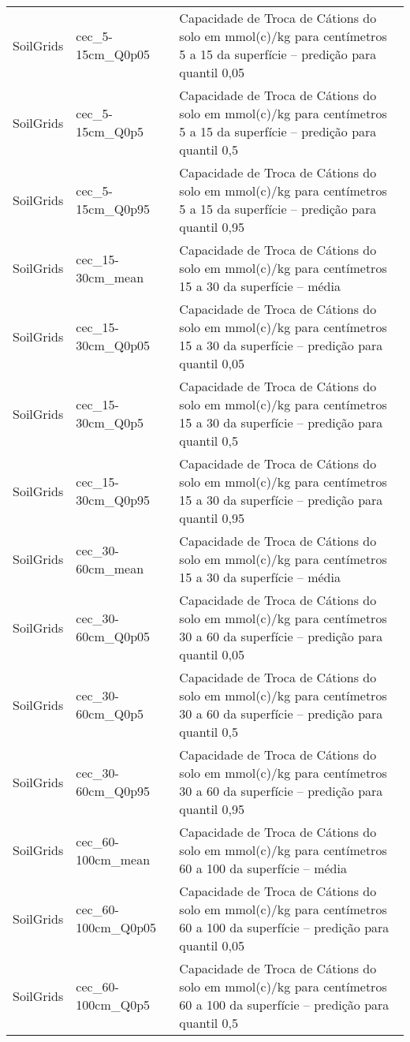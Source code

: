 \begin{longtable}{@{} p{4cm} p{4cm} p{8cm} @{}}
	SoilGrids &
	cec\_5-15cm\_Q0p05 &
	Capacidade de Troca de Cátions do solo em mmol(c)/kg para centímetros 5 a 15 da superfície – predição para quantil 0,05 \\
	SoilGrids &
	cec\_5-15cm\_Q0p5 &
	Capacidade de Troca de Cátions do solo em mmol(c)/kg para centímetros 5 a 15 da superfície – predição para quantil 0,5 \\
	SoilGrids &
	cec\_5-15cm\_Q0p95 &
	Capacidade de Troca de Cátions do solo em mmol(c)/kg para centímetros 5 a 15 da superfície – predição para quantil 0,95 \\
	SoilGrids &
	cec\_15-30cm\_mean &
	Capacidade de Troca de Cátions do solo em mmol(c)/kg para centímetros 15 a 30 da superfície – média \\
	SoilGrids &
	cec\_15-30cm\_Q0p05 &
	Capacidade de Troca de Cátions do solo em mmol(c)/kg para centímetros 15 a 30 da superfície – predição para quantil 0,05 \\
	SoilGrids &
	cec\_15-30cm\_Q0p5 &
	Capacidade de Troca de Cátions do solo em mmol(c)/kg para centímetros 15 a 30 da superfície – predição para quantil 0,5 \\
	SoilGrids &
	cec\_15-30cm\_Q0p95 &
	Capacidade de Troca de Cátions do solo em mmol(c)/kg para centímetros 15 a 30 da superfície – predição para quantil 0,95 \\
	SoilGrids &
	cec\_30-60cm\_mean &
	Capacidade de Troca de Cátions do solo em mmol(c)/kg para centímetros 15 a 30 da superfície – média \\
	SoilGrids &
	cec\_30-60cm\_Q0p05 &
	Capacidade de Troca de Cátions do solo em mmol(c)/kg para centímetros 30 a 60 da superfície – predição para quantil 0,05 \\
	SoilGrids &
	cec\_30-60cm\_Q0p5 &
	Capacidade de Troca de Cátions do solo em mmol(c)/kg para centímetros 30 a 60 da superfície – predição para quantil 0,5 \\
	SoilGrids &
	cec\_30-60cm\_Q0p95 &
	Capacidade de Troca de Cátions do solo em mmol(c)/kg para centímetros 30 a 60 da superfície – predição para quantil 0,95 \\
	SoilGrids &
	cec\_60-100cm\_mean &
	Capacidade de Troca de Cátions do solo em mmol(c)/kg para centímetros 60 a 100 da superfície – média \\
	SoilGrids &
	cec\_60-100cm\_Q0p05 &
	Capacidade de Troca de Cátions do solo em mmol(c)/kg para centímetros 60 a 100 da superfície – predição para quantil 0,05 \\
	SoilGrids &
	cec\_60-100cm\_Q0p5 &
	Capacidade de Troca de Cátions do solo em mmol(c)/kg para centímetros 60 a 100 da superfície – predição para quantil 0,5 \\

\end{longtable}
